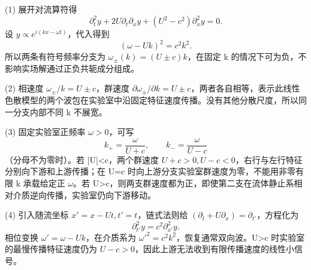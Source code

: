 (1) 展开对流算符得
\[
\partial_t^2y+2U\partial_t\partial_xy+(U^2-c^2)\partial_x^2y=0.
\]
设 \(y\propto e^{i(kx-\omega t)}\)，代入得到
\[
(\omega-Uk)^2=c^2k^2.
\]
所以两条有符号频率分支为 \(\omega_\pm(k)=(U\pm c)k\)，在固定 k 的情况下可为负，不影响实场解通过正负共轭成分组成。

(2) 相速度 \(\omega_\pm/k=U\pm c\)，群速度 \(\partial\omega_\pm/\partial k=U\pm c\)，两者各自相等，表示此线性色散模型的两个波包在实验室中沿固定特征速度传播。没有其他分散尺度，所以同一分支内部不同 k 不展宽。

(3) 固定实验室正频率 \(\omega >0\)，可写
\[
k_+=\frac{\omega}{U+c},\qquad k_-=\frac{\omega}{U-c}
\]
（分母不为零时）。若 |U|<c，两个群速度 \(U+c>0,U-c<0\)，右行与左行特征分别向下游和上游传播；在 U=c 时向上游分支实验室群速度为零，不能用非零有限 k 承载给定正 \(\omega \)。若 U>c，则两支群速度都为正，即使第二支在流体静止系相对介质逆向传播，实验室仍向下游移动。

(4) 引入随流坐标 \(x'=x-Ut,t'=t\)，链式法则给 \((\partial_t+U\partial_x)=\partial_{t'}\)，方程化为
\[
\partial_{t'}^2y=c^2\partial_{x'}^2y.
\]
相位变换 \(\omega'=\omega-Uk\)，在介质系为 \(\omega'^2=c^2k^2\)，恢复通常双向波。U>c 时实验室的最慢传播特征速度仍为 \(U-c>0\)，因此上游无法收到有限传播速度的线性小信号。
